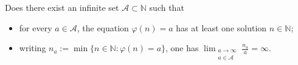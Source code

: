 Does there exist an infinite set $\mathcal{A}\subset\mathbb{N}$ such that
\begin{itemize}
\item for every $a\in\mathcal{A}$, the equation $\varphi(n)=a$ has at least one solution $n\in\mathbb{N}$;
\item writing $n_a:=\min\{n\in\mathbb{N}:\varphi(n)=a\}$, one has $\lim_{\substack{a\to\infty\\ a\in\mathcal{A}}} \frac{n_a}{a}=\infty$.
\end{itemize}

